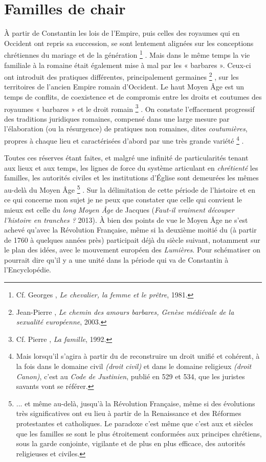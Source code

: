 

\chapter{Familles de chair}


 À partir de Constantin les lois de l'Empire, puis celles des royaumes qui en Occident ont repris sa succession, se sont lentement alignées sur les conceptions chrétiennes du mariage et de la génération%
\footnote{Cf. Georges , \emph{Le chevalier, la femme et le prêtre}, 1981.}%
. Mais dans le même temps la vie familiale à la romaine était également mise à mal par les « barbares ». Ceux-ci ont introduit des pratiques différentes, principalement germaines%
\footnote{Jean-Pierre , \emph{Le chemin des amours barbares, Genèse médiévale de la sexualité européenne}, 2003.}%
, sur les territoires de l'ancien Empire romain d'Occident. Le haut Moyen Âge est un temps de conflits, de coexistence et de compromis entre les droits et coutumes des royaumes « barbares » et le droit romain%
\footnote{Cf. Pierre , \emph{La famille}, 1992.}%
. On constate l'effacement progressif des traditions juridiques romaines, compensé dans une large mesure par l'élaboration (ou la résurgence) de pratiques non romaines, dites \emph{coutumières}, propres à chaque lieu et caractérisées d'abord par une très grande variété%
\footnote{Mais lorsqu'il s'agira à partir du  de reconstruire un droit unifié et cohérent, à la fois dans le domaine civil \emph{(droit civil)} et dans le domaine religieux \emph{(droit Canon)}, c'est au \emph{Code de Justinien}, publié en 529 et 534, que les juristes savants vont se référer.}%
. 

 Toutes ces réserves étant faites, et malgré une infinité de particularités tenant aux lieux et aux temps, les lignes de force du système articulant en \emph{chrétienté} les familles, les autorités civiles et les institutions d'Église sont demeurées les mêmes au-delà du Moyen Âge%
\footnote{... et même au-delà, jusqu'à la Révolution Française, même si des évolutions très significatives ont eu lieu à partir de la Renaissance et des Réformes protestantes et catholiques. Le paradoxe c'est même que c'est aux  et  siècles que les familles se sont le plus étroitement conformées aux principes chrétiens, sous la garde conjointe, vigilante et de plus en plus efficace, des autorités religieuses et civiles.}%
. Sur la délimitation de cette période de l'histoire et en ce qui concerne mon sujet je ne peux que constater que celle qui convient le mieux est celle du \emph{long Moyen Âge} de Jacques  (\emph{Faut-il vraiment découper l'histoire en tranches ?} 2013). À bien des points de vue le Moyen Âge ne s'est achevé qu'avec la Révolution Française, même si la deuxième moitié du  (à partir de 1760 à quelques années près) participait déjà du siècle suivant, notamment sur le plan des idées, avec le mouvement européen des \emph{Lumières}. Pour schématiser on pourrait dire qu'il y a une unité dans la période qui va de Constantin à l'Encyclopédie. 

